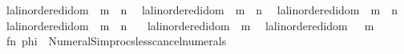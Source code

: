 \begin{isabellebody}
\ \ {\isacharbar}{\kern0pt}{\isachardoublequoteopen}{\isacharparenleft}{\kern0pt}l{\isacharcolon}{\kern0pt}{\isacharcolon}{\kern0pt}{\isacharprime}{\kern0pt}a{\isacharcolon}{\kern0pt}{\isacharcolon}{\kern0pt}linordered{\isacharunderscore}{\kern0pt}idom{\isacharparenright}{\kern0pt}\ {\isacharminus}{\kern0pt}\ m\ {\isacharless}{\kern0pt}\ n{\isachardoublequoteclose}\isanewline
\ \ {\isacharbar}{\kern0pt}{\isachardoublequoteopen}{\isacharparenleft}{\kern0pt}l{\isacharcolon}{\kern0pt}{\isacharcolon}{\kern0pt}{\isacharprime}{\kern0pt}a{\isacharcolon}{\kern0pt}{\isacharcolon}{\kern0pt}linordered{\isacharunderscore}{\kern0pt}idom{\isacharparenright}{\kern0pt}\ {\isacharless}{\kern0pt}\ m\ {\isacharminus}{\kern0pt}\ n{\isachardoublequoteclose}\isanewline
\ \ {\isacharbar}{\kern0pt}{\isachardoublequoteopen}{\isacharparenleft}{\kern0pt}l{\isacharcolon}{\kern0pt}{\isacharcolon}{\kern0pt}{\isacharprime}{\kern0pt}a{\isacharcolon}{\kern0pt}{\isacharcolon}{\kern0pt}linordered{\isacharunderscore}{\kern0pt}idom{\isacharparenright}{\kern0pt}\ {\isacharasterisk}{\kern0pt}\ m\ {\isacharless}{\kern0pt}\ n{\isachardoublequoteclose}\isanewline
\ \ {\isacharbar}{\kern0pt}{\isachardoublequoteopen}{\isacharparenleft}{\kern0pt}l{\isacharcolon}{\kern0pt}{\isacharcolon}{\kern0pt}{\isacharprime}{\kern0pt}a{\isacharcolon}{\kern0pt}{\isacharcolon}{\kern0pt}linordered{\isacharunderscore}{\kern0pt}idom{\isacharparenright}{\kern0pt}\ {\isacharless}{\kern0pt}\ m\ {\isacharasterisk}{\kern0pt}\ n{\isachardoublequoteclose}\isanewline
\ \ {\isacharbar}{\kern0pt}{\isachardoublequoteopen}{\isacharminus}{\kern0pt}\ {\isacharparenleft}{\kern0pt}l{\isacharcolon}{\kern0pt}{\isacharcolon}{\kern0pt}{\isacharprime}{\kern0pt}a{\isacharcolon}{\kern0pt}{\isacharcolon}{\kern0pt}linordered{\isacharunderscore}{\kern0pt}idom{\isacharparenright}{\kern0pt}\ {\isacharless}{\kern0pt}\ m{\isachardoublequoteclose}\isanewline
\ \ {\isacharbar}{\kern0pt}{\isachardoublequoteopen}{\isacharparenleft}{\kern0pt}l{\isacharcolon}{\kern0pt}{\isacharcolon}{\kern0pt}{\isacharprime}{\kern0pt}a{\isacharcolon}{\kern0pt}{\isacharcolon}{\kern0pt}linordered{\isacharunderscore}{\kern0pt}idom{\isacharparenright}{\kern0pt}\ {\isacharless}{\kern0pt}\ {\isacharminus}{\kern0pt}\ m{\isachardoublequoteclose}{\isacharparenright}{\kern0pt}\ {\isacharequal}{\kern0pt}\isanewline
\ \ {\isacartoucheopen}fn\ phi\ {\isacharequal}{\kern0pt}{\isachargreater}{\kern0pt}\ Numeral{\isacharunderscore}{\kern0pt}Simprocs{\isachardot}{\kern0pt}less{\isacharunderscore}{\kern0pt}cancel{\isacharunderscore}{\kern0pt}numerals{\isacartoucheclose}\isanewline
\isanewline

\end{isabellebody}
